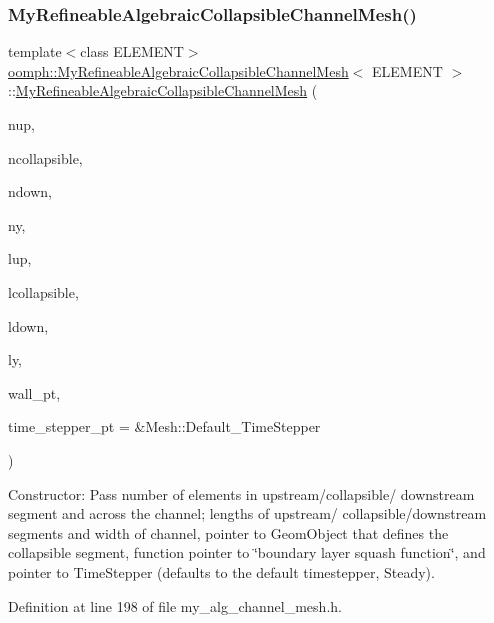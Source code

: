 \subsubsection{\texorpdfstring{My\+Refineable\+Algebraic\+Collapsible\+Channel\+Mesh()}{MyRefineableAlgebraicCollapsibleChannelMesh()}\hspace{0.1cm}{\footnotesize\ttfamily [1/2]}}
{\footnotesize\ttfamily template$<$class E\+L\+E\+M\+E\+NT$>$ \\
\hyperlink{classoomph_1_1MyRefineableAlgebraicCollapsibleChannelMesh}{oomph\+::\+My\+Refineable\+Algebraic\+Collapsible\+Channel\+Mesh}$<$ E\+L\+E\+M\+E\+NT $>$\+::\hyperlink{classoomph_1_1MyRefineableAlgebraicCollapsibleChannelMesh}{My\+Refineable\+Algebraic\+Collapsible\+Channel\+Mesh} (\begin{DoxyParamCaption}\item[{const unsigned \&}]{nup,  }\item[{const unsigned \&}]{ncollapsible,  }\item[{const unsigned \&}]{ndown,  }\item[{const unsigned \&}]{ny,  }\item[{const double \&}]{lup,  }\item[{const double \&}]{lcollapsible,  }\item[{const double \&}]{ldown,  }\item[{const double \&}]{ly,  }\item[{Geom\+Object $\ast$}]{wall\+\_\+pt,  }\item[{Time\+Stepper $\ast$}]{time\+\_\+stepper\+\_\+pt = {\ttfamily \&Mesh\+:\+:Default\+\_\+TimeStepper} }\end{DoxyParamCaption})\hspace{0.3cm}{\ttfamily [inline]}}



Constructor\+: Pass number of elements in upstream/collapsible/ downstream segment and across the channel; lengths of upstream/ collapsible/downstream segments and width of channel, pointer to Geom\+Object that defines the collapsible segment, function pointer to \char`\"{}boundary layer squash function\char`\"{}, and pointer to Time\+Stepper (defaults to the default timestepper, Steady). 



Definition at line 198 of file my\+\_\+alg\+\_\+channel\+\_\+mesh.\+h.

\mbox{\label{classoomph_1_1MyRefineableAlgebraicCollapsibleChannelMesh_a1a733580c1e040c6d546e6ec78d844ee}} 
